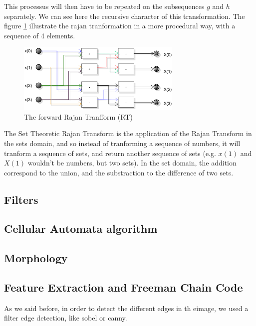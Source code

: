 This processus will then have to be repeated on the subsequences $g$ and $h$ separately. We can see here the recursive character of this transformation. The figure \ref{fig:diagram:flowchart:rajan} illustrate the rajan tranformation in a more procedural way, with a sequence of 4 elements. 

\begin{figure}[H]
	\centering
	\includegraphics[width=0.7\textwidth]{images/diagrams/flowchart_rajan_transform}
	\caption{The forward Rajan Tranfform (RT)}
	\label{fig:diagram:flowchart:rajan}	
\end{figure}


The Set Theoretic Rajan Transform is the application of the Rajan Transform in the sets domain, and so instead of tranforming a sequence of numbers, it will tranform a sequence of sets, and return another sequence of sets (e.g. $x(1)$ and $X(1)$ wouldn't be numbers, but two sets). In the set domain, the addition correspond to the union, and the substraction to the difference of two sets.





\subsection{Filters}

\subsection{Cellular Automata algorithm}

\subsection{Morphology}

\subsection{Feature Extraction and Freeman Chain Code}

As we said before, in order to detect the different edges in th eimage, we used a filter edge detection, like sobel or canny. 


